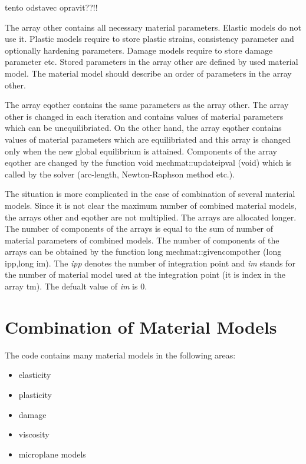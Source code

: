 tento odstavec opravit??!!

The array {\sf other} contains all necessary material parameters. Elastic models do not use it. Plastic
models require to store plastic strains, consistency parameter and optionally hardening parameters.
Damage models require to store damage parameter etc. Stored parameters in the array {\sf other} are
defined by used material model. The material model should describe an order of parameters in the
array {\sf other}.

The array {\sf eqother} contains the same parameters as the array {\sf other}. The array {\sf other}
is changed in each iteration and contains values of material parameters which can be unequilibriated.
On the other hand, the array {\sf eqother} contains values of material parameters which are
equilibriated and this array is changed only when the new global equilibrium is attained.
Components of the array {\sf eqother} are changed by the function {\sf void mechmat::updateipval (void)}
which is called by the solver (arc-length, Newton-Raphson method etc.).

The situation is more complicated in the case of combination of several material models. Since it is
not clear the maximum number of combined material models, the arrays {\sf other} and {\sf eqother}
are not multiplied. The arrays are allocated longer. The number of components of the arrays is
equal to the sum of number of material parameters of combined models. The number of components
of the arrays can be obtained by the function {\sf long mechmat::givencompother (long ipp,long im)}.
The {\it ipp} denotes the number of integration point and {\it im} stands for the number of
material model used at the integration point (it is index in the array {\sf tm}).
The defualt value of {\it im} is 0.

\section{Combination of Material Models}

The code contains many material models in the following areas:
\begin{itemize}
\item{elasticity}
\item{plasticity}
\item{damage}
\item{viscosity}
\item{microplane models}
\end{itemize}

